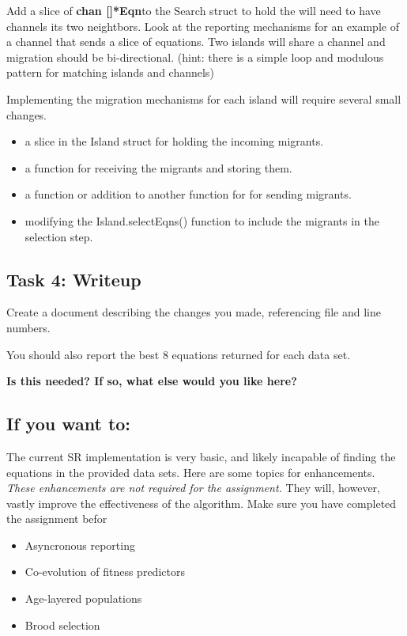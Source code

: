 \documentclass[a4paper,10pt]{article}
\begin{document}
Add a slice of \textbf{chan []*Eqn}to the Search struct to hold the 
will need to have channels its two neightbors.
Look at the reporting mechanisms for an example
of a channel that sends a slice of equations.
Two islands will share a channel
and migration should be bi-directional.
(hint: there is a simple loop and modulous pattern for matching islands and channels)

Implementing the migration mechanisms for each island
will require several small changes.
\begin{itemize}
\item a slice in the Island struct for holding the incoming migrants.
\item a function for receiving the migrants and storing them.
\item a function or addition to another function for for sending migrants.
\item modifying the Island.selectEqns() function to include the migrants in the selection step.
\end{itemize}


\subsection*{Task 4: Writeup}
Create a document describing the changes you made,
referencing file and line numbers.

You should also report the best 8 equations
returned for each data set.

\textbf{Is this needed? If so, what else would you like here?}

\subsection*{If you want to:}
The current SR implementation is very basic,
and likely incapable of finding the equations
in the provided data sets.
Here are some topics for enhancements.
\textit{These enhancements are not required for the assignment.}
They will, however, vastly improve the effectiveness of the algorithm.
Make sure you have completed the assignment befor
\begin{itemize}
\item Asyncronous reporting
\item Co-evolution of fitness predictors
\item Age-layered populations
\item Brood selection
\end{itemize}
\end{document}
